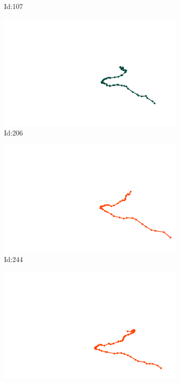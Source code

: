 \documentclass[12pt,twoside]{report}
\begin{document}
\begin{figure}
\begin{subfigure}[b]{0.20\textwidth}
\caption{Id:107}
\end{subfigure}
\begin{subfigure}[b]{0.20\textwidth}
\centering
\includegraphics[width=\textwidth]{../trajectories/206.png}
\caption{Id:206}
\end{subfigure}
\begin{subfigure}[b]{0.20\textwidth}
\centering
\includegraphics[width=\textwidth]{../trajectories/244.png}
\caption{Id:244}
\end{subfigure}
\begin{subfigure}[b]{0.20\textwidth}
\centering
\includegraphics[width=\textwidth]{../trajectories/314.png}

\end{subfigure}
\end{figure}
\end{document}
